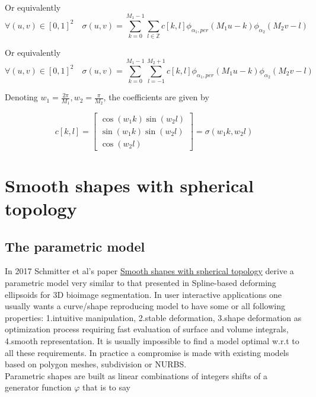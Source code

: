 \documentclass[a4paper, 11pt]{article}
\begin{document}
Or equivalently
\begin{equation}
  \forall (u,v) \in {[0,1]}^2 \quad \sigma(u,v) = \sum_{k=0}^{M_1-1} \sum_{l \in \mathbb{Z}} c[k,l] \phi_{\alpha_1, 
  per}(M_1u-k) \phi_{\alpha_2}(M_2v-l)
\end{equation}

Or equivalently
\begin{equation}
  \boxed{\forall (u,v) \in {[0,1]}^2 \quad \sigma(u,v) = \sum_{k=0}^{M_1-1} \sum_{l=-1}^{M_2+1} c[k,l] \phi_{\alpha_1, 
  per}(M_1u-k) \phi_{\alpha_2}(M_2v-l)}
\end{equation}

Denoting $w_1 = \frac{2\pi}{M_1}, w_2 = \frac{\pi}{M_2}$, the coefficients are given by

\begin{equation}
  \boxed{c[k,l] =\begin{bmatrix} \cos(w_1k)\sin(w_2l) \\ \sin(w_1k)\sin(w_2l) \\ \cos(w_2l) \end{bmatrix} = 
\sigma(w_1k,w_2l)} 
\end{equation}

\section{Smooth shapes with spherical topology}

\subsection{The parametric model}

In 2017 Schmitter et al's paper \underline{Smooth shapes with spherical topology} derive a parametric model very similar 
to that presented in Spline-based deforming ellipsoids for 3D bioimage segmentation. In user interactive applications 
one usually wants a curve/shape reproducing model to have some or all following properties: 1.intuitive manipulation, 
2.stable deformation, 3.shape deformation as optimization process requiring fast evaluation of surface and volume 
integrals, 4.smooth representation. It is usually impossible to find a model optimal w.r.t to all these requirements.  
In practice a compromise is made with existing models based on polygon meshes, subdivision or NURBS\@. \\

Parametric shapes are built as linear combinations of integers shifts of a generator function $\varphi$ that is to say
\end{document}
